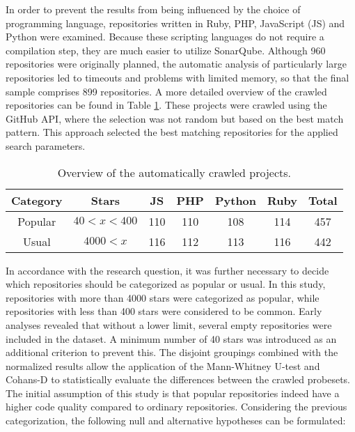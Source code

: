 \documentclass[a4paper, 12pt]{article}
\begin{document}
In order to prevent the results from being influenced by the choice of programming language, repositories written in Ruby, PHP, JavaScript (JS) and Python were examined. Because these scripting languages do not require a compilation step, they are much easier to utilize SonarQube. Although 960 repositories were originally planned, the automatic analysis of particularly large repositories led to timeouts and problems with limited memory, so that the final sample comprises 899 repositories. A more detailed overview of the crawled repositories can be found in Table \ref{tab:repo_counts}. These projects were crawled using the GitHub API\autocite{GitHub-Api}, where the selection was not random but based on the best match pattern. This approach selected the best matching repositories for the applied search parameters.

\begin{table}[ht]
\centering
\begin{tabular}{|c|c|c|c|c|c|c|}
\hline
\textbf{Category} & \textbf{Stars} & \textbf{JS} & \textbf{PHP} & \textbf{Python} & \textbf{Ruby} & \textbf{Total} \\
\hline
Popular & $40 < x < 400$ & 110 & 110 & 108 & 114 & 457\\
\hline
Usual & $ 4000 < x $ & 116 & 112 & 113 & 116 & 442 \\
\hline
\end{tabular}
\caption{Overview of the automatically crawled projects.}
\label{tab:repo_counts}
\end{table}

In accordance with the research question, it was further necessary to decide which repositories should be categorized as popular or usual. In this study, repositories with more than 4000 stars were categorized as popular, while repositories with less than 400 stars were considered to be common. Early analyses revealed that without a lower limit, several empty repositories were included in the dataset. A minimum number of 40 stars was introduced as an additional criterion to prevent this. The disjoint groupings combined with the normalized results allow the application of the Mann-Whitney U-test and Cohans-D to statistically evaluate the differences between the crawled probesets.\\

The initial assumption of this study is that popular repositories indeed have a higher code quality compared to ordinary repositories. Considering the previous categorization, the following null and alternative hypotheses can be formulated:
\end{document}
